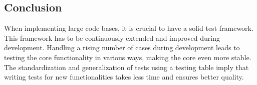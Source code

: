 \subsection{Conclusion}
\label{sub:Conclusion}
When implementing large code bases, it is crucial to have a solid test
framework. This framework has to be continuously extended and improved during
development.
Handling a rising number of cases during development leads to testing the core
functionality in various ways, making the core even more stable.
\newline
The standardization and generalization of tests using a testing table imply that
writing tests for new functionalities takes less time and ensures better
quality.
